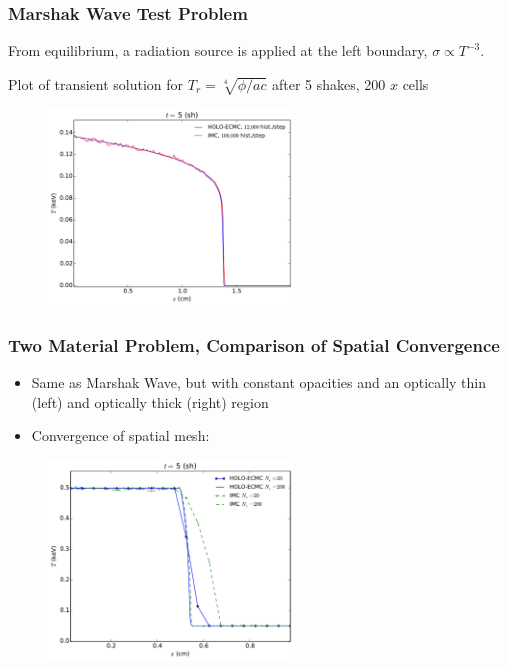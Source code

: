 \documentclass[xcolor=dvipsnames,handout,hyperref={pdfpagelabels=false}]{beamer}
\newlength{\wideitemsep}
\let\olditem\item
\renewcommand{\item}{\setlength{\itemsep}{\wideitemsep}\olditem}
\begin{document}
\begin{frame}
    \frametitle{Marshak Wave Test Problem}
    \centering
    \begin{block}{}
        \begin{itemize}
                {\small
            \item From equilibrium, a radiation source is applied at the left
                boundary, $\sigma\propto T^{-3}$.
            \item Plot of transient solution for $T_r = \sqrt[4]{\phi/ac}$ after 5
            shakes, 200 $x$ cells }
        \end{itemize}
    \end{block}
    \begin{figure}
    \includegraphics[width=0.5799\textwidth]{marshak_200_compare.pdf}
    \end{figure}
\end{frame}

\begin{frame}
    \frametitle{Two Material Problem, Comparison of Spatial Convergence}
    \begin{block}{}
        \begin{itemize}
            \item Same as Marshak Wave, but with constant opacities and an optically thin (left) and
                optically thick (right) region 
            \item Convergence of spatial mesh:
        \end{itemize}
    \end{block}
\begin{figure}
    \centering
    \includegraphics[width=0.5799\textwidth]{two_mat_conv.pdf}
\end{figure}

\end{frame}
\end{document}
